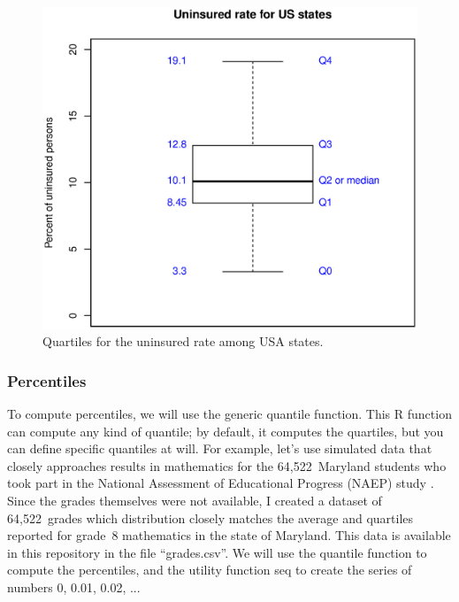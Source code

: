 \documentclass{report}
\newcommand{\code}[1]{\textsf{\ttfamily #1}}
\begin{document}
		\begin{figure}[h]
			\centering
			\includegraphics[width=1.0\textwidth]{quartiles.eps}
			\caption{Quartiles for the uninsured rate among USA states.}
			\label{fig:queues}
		\end{figure}
		
		\subsubsection{Percentiles}
		To compute percentiles, we will use the generic \code{quantile} function. This R function can compute any kind of quantile; by default, it computes the quartiles, but you can define specific quantiles at will. For example, let's use simulated data that closely approaches results in mathematics for the 64,522~Maryland students who took part in the National Assessment of Educational Progress (NAEP) study \cite{naep, mdnaep}. Since the grades themselves were not available, I created a dataset of 64,522~grades which distribution closely matches the average and quartiles reported for grade~8 mathematics in the state of Maryland. This data is available in this repository in the file ``grades.csv''. We will use the \code{quantile} function to compute the percentiles, and the utility function \code{seq} to create the series of numbers 0, 0.01, 0.02, ...
		
\end{document}
